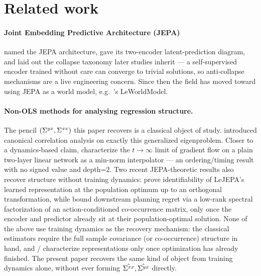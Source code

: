 \section{Related work}
\label{sec:related}

\paragraph{Joint Embedding Predictive Architecture (JEPA)}
\citet{LeCun2022} named the JEPA architecture, gave its two-encoder latent-prediction
diagram, and laid out the collapse taxonomy later studies inherit --- a self-supervised
encoder trained without care can converge to trivial solutions, so anti-collapse
mechanisms are a live engineering concern. Since then the field has moved toward using
JEPA as a world model, e.g.\ \citet{Maes2026LeWM}'s LeWorldModel.

\paragraph{Non-OLS methods for analysing regression structure.}
The pencil $(\Sigma^{yx},\Sigma^{xx})$ this paper recovers is a classical object of study. \citet{Hotelling1936} introduced canonical correlation
analysis on exactly this generalized eigenproblem. Closer to
a dynamics-based claim, \citet{Varre2023} characterize the $t\to\infty$ limit of
gradient flow on a plain two-layer linear network as a min-norm interpolator --- an
ordering/timing result with no signed value and depth=$2$. Two recent JEPA-theoretic results also
recover structure without training dynamics: \citet{Klindt2026} prove identifiability
of LeJEPA's learned representation at the population optimum up to an orthogonal
transformation, while \citet{Cui2026} bound downstream planning regret via a low-rank spectral factorization
of an action-conditioned co-occurrence matrix, only once the encoder and predictor
already sit at their population-optimal solution. None of the above use training
dynamics as the recovery mechanism: the classical estimators require the full sample
covariance (or co-occurrence) structure in hand, and \citeauthor{Klindt2026}/
\citeauthor{Cui2026} characterize representations only once optimization has already
finished. The present paper recovers the same kind of object from training dynamics
alone, without ever forming $\hat{\Sigma^{xx}}, \hat{\Sigma^{yx}}$ directly.

